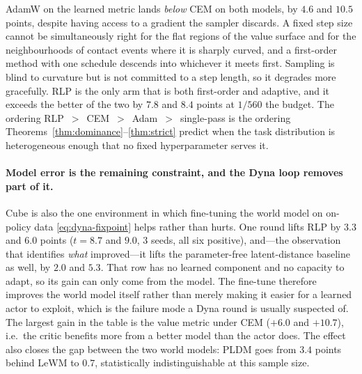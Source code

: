 \noindent
AdamW on the learned metric lands \emph{below} CEM on both models, by $4.6$ and
$10.5$ points, despite having access to a gradient the sampler discards. A fixed
step size cannot be simultaneously right for the flat regions of the value
surface and for the neighbourhoods of contact events where it is sharply curved,
and a first-order method with one schedule descends into whichever it meets
first. Sampling is blind to curvature but is not committed to a step length, so
it degrades more gracefully. RLP is the only arm that is both first-order and
adaptive, and it exceeds the better of the two by $7.8$ and $8.4$ points at
$1/560$ the budget. The ordering \mbox{RLP $>$ CEM $>$ Adam $>$ single-pass} is
the ordering Theorems~\ref{thm:dominance}--\ref{thm:strict} predict when the
task distribution is heterogeneous enough that no fixed hyperparameter serves
it.

\paragraph{Model error is the remaining constraint, and the Dyna loop removes
part of it.}
Cube is also the one environment in which fine-tuning the world model on
on-policy data \eqref{eq:dyna-fixpoint} helps rather than hurts. One round lifts
RLP by $3.3$ and $6.0$ points ($t = 8.7$ and $9.0$, $3$ seeds, all six
positive), and---the observation that identifies \emph{what} improved---it lifts
the parameter-free latent-distance baseline as well, by $2.0$ and $5.3$. That
row has no learned component and no capacity to adapt, so its gain can only come
from the model. The fine-tune therefore improves the world model itself rather
than merely making it easier for a learned actor to exploit, which is the
failure mode a Dyna round is usually suspected of. The largest gain in the table
is the value metric under CEM ($+6.0$ and $+10.7$), i.e.\ the critic benefits
more from a better model than the actor does. The effect also closes the gap
between the two world models: PLDM goes from $3.4$ points behind LeWM to $0.7$,
statistically indistinguishable at this sample size.

